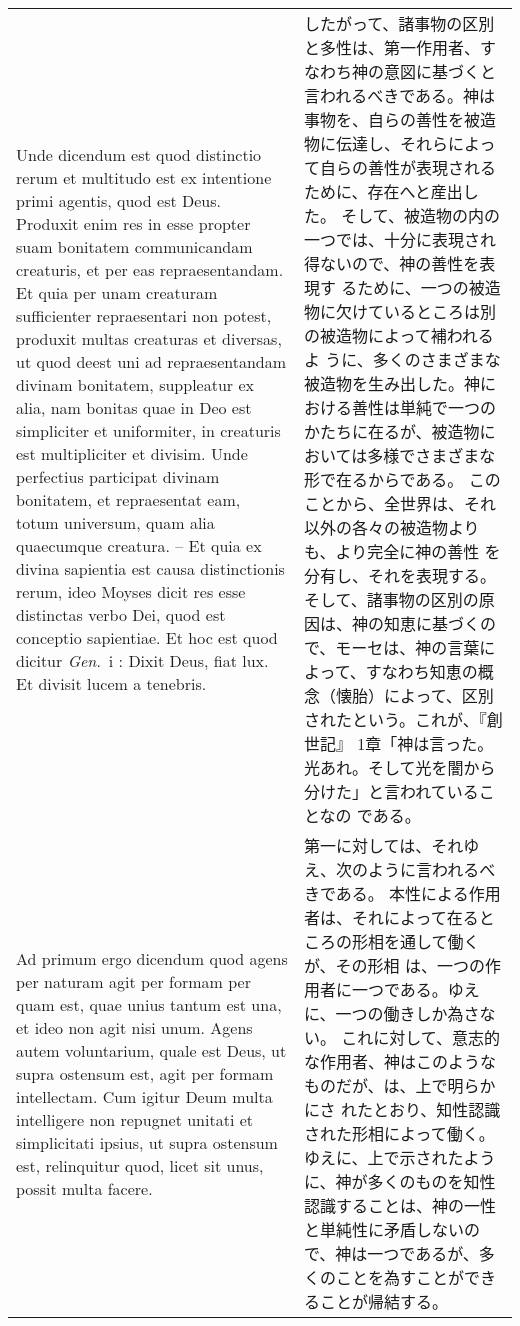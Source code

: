 \documentclass[10pt]{jsarticle} %
\begin{document}
\begin{longtable}{p{21em}p{21em}}
Unde dicendum est quod distinctio rerum et multitudo est ex intentione
 primi agentis, quod est Deus. Produxit enim res in esse propter suam
 bonitatem communicandam creaturis, et per eas repraesentandam. Et quia
 per unam creaturam sufficienter repraesentari non potest, produxit
 multas creaturas et diversas, ut quod deest uni ad repraesentandam
 divinam bonitatem, suppleatur ex alia, nam bonitas quae in Deo est
 simpliciter et uniformiter, in creaturis est multipliciter et
 divisim. Unde perfectius participat divinam bonitatem, et repraesentat
 eam, totum universum, quam alia quaecumque creatura. -- Et quia ex divina
 sapientia est causa distinctionis rerum, ideo Moyses dicit res esse
 distinctas verbo Dei, quod est conceptio sapientiae. Et hoc est quod
 dicitur {\it Gen}.~{\sc i} : {\sc Dixit Deus, fiat lux. Et divisit
 lucem a tenebris}.

&
したがって、諸事物の区別と多性は、第一作用者、すなわち神の意図に基づくと
 言われるべきである。神は事物を、自らの善性を被造物に伝達し、それらによっ
 て自らの善性が表現されるために、存在へと産出した。
そして、被造物の内の一つでは、十分に表現され得ないので、神の善性を表現す
 るために、一つの被造物に欠けているところは別の被造物によって補われるよ
 うに、多くのさまざまな被造物を生み出した。神における善性は単純で一つの
 かたちに在るが、被造物においては多様でさまざまな形で在るからである。
このことから、全世界は、それ以外の各々の被造物よりも、より完全に神の善性
 を分有し、それを表現する。
そして、諸事物の区別の原因は、神の知恵に基づくので、モーセは、神の言葉に
 よって、すなわち知恵の概念（懐胎）によって、区別されたという。これが、『創世記』
 1章「神は言った。光あれ。そして光を闇から分けた」と言われていることなの
 である。


\\





{\sc Ad primum ergo dicendum} quod agens per
 naturam agit per formam per quam est, quae unius tantum est una, et
 ideo non agit nisi unum. Agens autem voluntarium, quale est Deus, ut
 supra ostensum est, agit per formam intellectam. Cum igitur Deum multa
 intelligere non repugnet unitati et simplicitati ipsius, ut supra
 ostensum est, relinquitur quod, licet sit unus, possit multa facere.


&

第一に対しては、それゆえ、次のように言われるべきである。
本性による作用者は、それによって在るところの形相を通して働くが、その形相
 は、一つの作用者に一つである。ゆえに、一つの働きしか為さない。
これに対して、意志的な作用者、神はこのようなものだが、は、上で明らかにさ
 れたとおり、知性認識された形相によって働く。
ゆえに、上で示されたように、神が多くのものを知性認識することは、神の一性
 と単純性に矛盾しないので、神は一つであるが、多くのことを為すことができ
 ることが帰結する。


\end{longtable}
\end{document}

